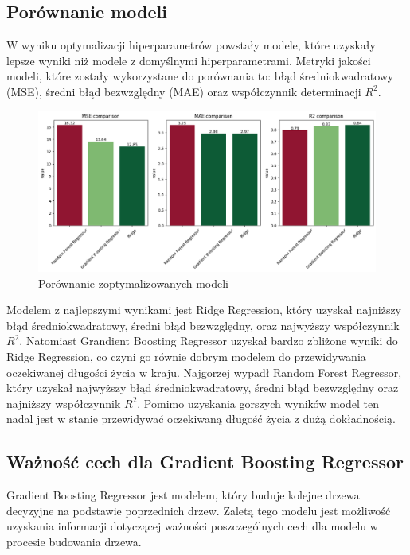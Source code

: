 \documentclass{article}
\begin{document}
\subsection{Porównanie modeli}
W wyniku optymalizacji hiperparametrów powstały modele, które uzyskały lepsze wyniki niż modele z domyślnymi hiperparametrami.
Metryki jakości modeli, które zostały wykorzystane do porównania to: błąd średniokwadratowy (MSE), średni błąd bezwzględny (MAE) oraz współczynnik determinacji $R^{2}$.
\begin{figure}[H]
    \label{fig:models_comparison_optimized}
    \includegraphics[width=\textwidth]{graphs/optimized_comparsion.png}
    \caption{Porównanie zoptymalizowanych modeli}
    \centering
\end{figure}
Modelem z najlepszymi wynikami jest Ridge Regression, który uzyskał najniższy błąd średniokwadratowy, średni błąd bezwzględny, oraz najwyższy współczynnik $R^{2}$.
Natomiast Grandient Boosting Regressor uzyskał bardzo zbliżone wyniki do Ridge Regression, co czyni go równie dobrym modelem do przewidywania oczekiwanej długości życia w kraju.
Najgorzej wypadł Random Forest Regressor, który uzyskał najwyższy błąd średniokwadratowy, średni błąd bezwzględny oraz najniższy współczynnik $R^{2}$. 
Pomimo uzyskania gorszych wyników model ten nadal jest w stanie przewidywać oczekiwaną długość życia z dużą dokładnością.

\subsection{Ważność cech dla Gradient Boosting Regressor}

Gradient Boosting Regressor jest modelem, który buduje kolejne drzewa decyzyjne na podstawie poprzednich drzew.
Zaletą tego modelu jest możliwość uzyskania informacji dotyczącej ważności poszczególnych cech dla modelu w procesie budowania drzewa.
\end{document}
